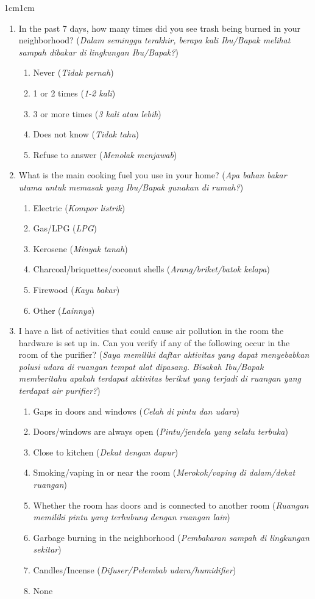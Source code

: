 \documentclass[9pt,twoside]{pnas-new}
\begin{document}
\begin{adjustwidth}{1cm}{1cm}
\begin{enumerate}
    \item In the past 7 days, how many times did you see trash being burned in your neighborhood? (\textit{Dalam seminggu terakhir, berapa kali Ibu/Bapak melihat sampah dibakar di lingkungan Ibu/Bapak?})
    \begin{enumerate}
        \item Never (\textit{Tidak pernah})
        \item 1 or 2 times (\textit{1-2 kali})
        \item 3 or more times (\textit{3 kali atau lebih})
        \item Does not know (\textit{Tidak tahu})
        \item Refuse to answer (\textit{Menolak menjawab})
    \end{enumerate}
    \item What is the main cooking fuel you use in your home? (\textit{Apa bahan bakar utama untuk memasak yang Ibu/Bapak gunakan di rumah?})
    \begin{enumerate}
        \item Electric (\textit{Kompor listrik})
        \item Gas/LPG (\textit{LPG})
        \item Kerosene (\textit{Minyak tanah})
        \item Charcoal/briquettes/coconut shells (\textit{Arang/briket/batok kelapa})
        \item Firewood (\textit{Kayu bakar})
        \item Other (\textit{Lainnya})
    \end{enumerate}

    
    \item I have a list of activities that could cause air pollution in the room the hardware is set up in. Can you verify if any of the following occur in the room of the purifier? (\textit{Saya memiliki daftar aktivitas yang dapat menyebabkan polusi udara di ruangan tempat alat dipasang. Bisakah Ibu/Bapak memberitahu apakah terdapat aktivitas berikut yang terjadi di ruangan yang terdapat air purifier?})
    \begin{enumerate}
        \item Gaps in doors and windows (\textit{Celah di pintu dan udara})
        \item Doors/windows are always open (\textit{Pintu/jendela yang selalu terbuka})
        \item Close to kitchen (\textit{Dekat dengan dapur})
        \item Smoking/vaping in or near the room (\textit{Merokok/vaping di dalam/dekat ruangan})
        \item Whether the room has doors and is connected to another room (\textit{Ruangan memiliki pintu yang terhubung dengan ruangan lain})
        \item Garbage burning in the neighborhood (\textit{Pembakaran sampah di lingkungan sekitar})
        \item Candles/Incense (\textit{Difuser/Pelembab udara/humidifier})
        \item None
    \end{enumerate}


\end{enumerate}
\end{adjustwidth}
\end{document}
